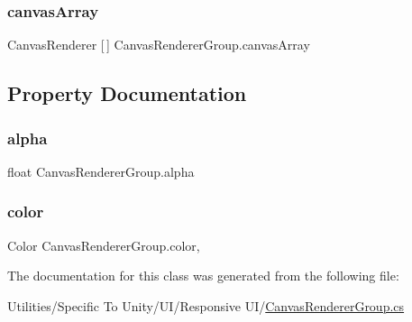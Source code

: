 \subsubsection{\texorpdfstring{canvas\+Array}{canvasArray}}
{\footnotesize\ttfamily Canvas\+Renderer \mbox{[}$\,$\mbox{]} Canvas\+Renderer\+Group.\+canvas\+Array}



\subsection{Property Documentation}
\mbox{\label{class_canvas_renderer_group_a2ada95b5b09338905ea9055956f678bd}} 
\subsubsection{\texorpdfstring{alpha}{alpha}}
{\footnotesize\ttfamily float Canvas\+Renderer\+Group.\+alpha\hspace{0.3cm}{\ttfamily [set]}}

\mbox{\label{class_canvas_renderer_group_a86f450abaae48e258e55672f03a7c755}} 
\subsubsection{\texorpdfstring{color}{color}}
{\footnotesize\ttfamily Color Canvas\+Renderer\+Group.\+color\hspace{0.3cm}{\ttfamily [get]}, {\ttfamily [set]}}



The documentation for this class was generated from the following file\+:\begin{DoxyCompactItemize}
\item 
Utilities/\+Specific To Unity/\+U\+I/\+Responsive U\+I/\hyperlink{_canvas_renderer_group_8cs}{Canvas\+Renderer\+Group.\+cs}\end{DoxyCompactItemize}
